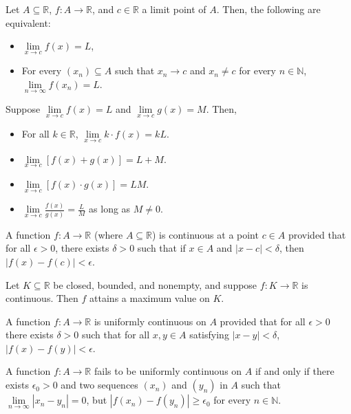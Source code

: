 \documentclass{article}
\begin{document}
\medskip
{}

    Let $A \subseteq \mathbb R$, $f: A \to \mathbb R$, and $c \in \mathbb R$ a limit point of $A$. Then, the following are equivalent:
    \begin{itemize}
        \item $\lim\limits_{x\to c} f(x) = L$,
        \item For every $(x_n) \subseteq A$ such that $x_n \to c$ and $x_n \neq c$ for every $n \in \mathbb N$, $\lim\limits_{n\to\infty} f(x_n)=L$.
    \end{itemize}

\medskip
{}

    Suppose $\lim\limits_{x\to c} f(x) = L$ and $\lim\limits_{x\to c}g(x) = M$. Then,
    \begin{itemize}
        \item For all $k \in \mathbb R$, $\lim\limits_{x\to c}k\cdot f(x) = kL$.
        \item $\lim\limits_{x\to c} [f(x) + g(x)] = L + M$.
        \item $\lim\limits_{x\to c} [f(x) \cdot g(x)] = LM$.
        \item $\lim\limits_{x\to c} \frac{f(x)}{g(x)} = \frac LM$ as long as $M \neq 0$.
    \end{itemize}

\medskip
{}

    A function $f: A \to \mathbb R$ (where $A \subseteq \mathbb R$) is continuous at a point $c \in A$ provided that for all $\epsilon > 0$, there exists $\delta > 0$ such that if $x \in A$ and $|x - c| < \delta$, then $|f(x) - f(c)| < \epsilon$.

\medskip
{}

    Let $K \subseteq \mathbb R$ be closed, bounded, and nonempty, and suppose $f:K \to \mathbb R$ is continuous. Then $f$ attains a maximum value on $K$.

\medskip
{}

    A function $f: A \to \mathbb R$ is uniformly continuous on $A$ provided that for all $\epsilon > 0$ there exists $\delta > 0$ such that for all $x, y \in A$ satisfying $|x - y| < \delta$, $|f(x) - f(y)| < \epsilon$.

\medskip
{}

    A function $f: A \to \mathbb R$ fails to be uniformly continuous on $A$ if and only if there exists $\epsilon_0 > 0$ and two sequences $(x_n)$ and $(y_n)$ in $A$ such that $\lim\limits_{n \to \infty}|x_n - y_n| = 0$, but $|f(x_n) - f(y_n)| \geq \epsilon_0$ for every $n \in \mathbb N$.
\end{document}

